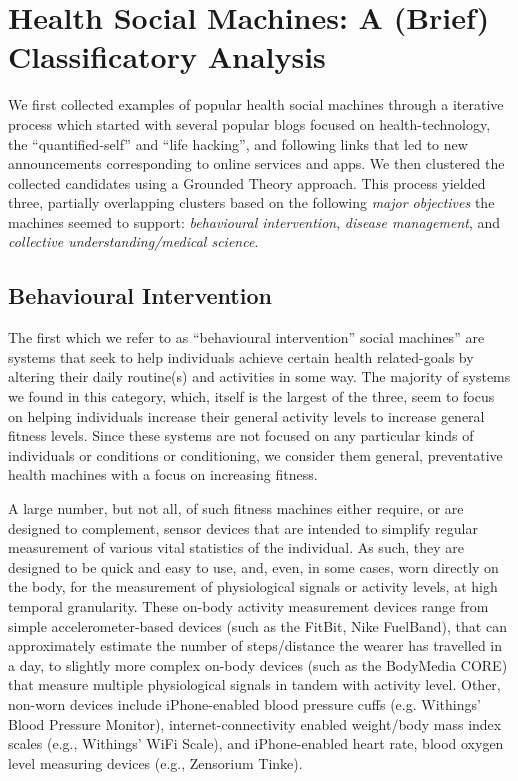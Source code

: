 \documentclass{sig-alternate}
\begin{document}
\section{Health Social Machines: A (Brief) Classificatory Analysis}

We first collected examples of popular health social machines through
a iterative process which started with several popular blogs focused
on health-technology, the ``quantified-self'' and ``life hacking'',
and following links that led to new announcements corresponding to
online services and apps.  We then clustered the collected candidates
using a Grounded Theory approach.  This process yielded three,
partially overlapping clusters based on the following \emph{major
  objectives} the machines seemed to support: \emph{behavioural
  intervention}, \emph{disease management}, and \emph{collective
  understanding/medical science}. 

\subsection{Behavioural Intervention}

The first which we refer to as ``behavioural intervention'' social
machines'' are systems that seek to help individuals achieve certain
health related-goals by altering their daily routine(s) and activities
in some way.  The majority of systems we found in this category,
which, itself is the largest of the three, seem to focus on helping
individuals increase their general activity levels to increase general
fitness levels.  Since these systems are not focused on any particular
kinds of individuals or conditions or conditioning, we consider them
general, preventative health machines with a focus on increasing
fitness.

A large number, but not all, of such fitness machines either require,
or are designed to complement, sensor devices that are intended to
simplify regular measurement of various vital statistics of the
individual.  As such, they are designed to be quick and easy to use,
and, even, in some cases, worn directly on the body, for the measurement
of physiological signals or activity levels, at high temporal
granularity. These on-body activity measurement devices range from
simple accelerometer-based devices (such as the FitBit, Nike
FuelBand), that can approximately estimate the number of
steps/distance the wearer has travelled in a day, to slightly more
complex on-body devices (such as the BodyMedia CORE) that measure
multiple physiological signals in tandem with activity level.  Other,
non-worn devices include iPhone-enabled blood pressure cuffs (e.g.
Withings' Blood Pressure Monitor), internet-connectivity enabled
weight/body mass index scales (e.g., Withings' WiFi Scale), and
iPhone-enabled heart rate, blood oxygen level measuring devices (e.g.,
Zensorium Tinke).  
\end{document}
